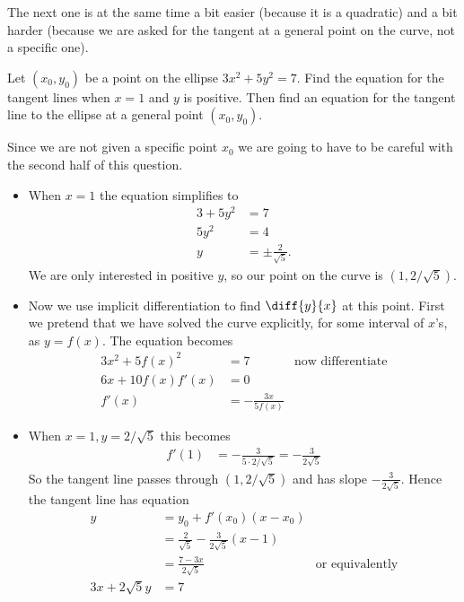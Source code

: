 The next one is at the same time a bit easier (because it is a quadratic) and a
bit harder (because we are asked for the tangent at a general point on the curve, not a
specific one).
\begin{eg}\label{eg:DIFFimpldiffA}
Let $(x_0,y_0)$ be a point on the ellipse $3x^2+5y^2=7$. Find the equation for
the tangent lines when $x=1$ and $y$ is positive. Then find an equation
for the tangent line to the ellipse at a general point $(x_0,y_0)$.

Since we are not given a specific point $x_0$ we are going to have to be
careful with the second half of this question.
\begin{itemize}
 \item When $x=1$ the equation simplifies to
\begin{align*}
  3 + 5y^2 &= 7 \\
  5y^2 &= 4 \\
  y &= \pm \frac{2}{\sqrt{5}}.
\end{align*}
We are only interested in positive $y$, so our point on the curve
is $(1,2/\sqrt{5})$.

\item Now we use implicit differentiation to find $\diff{y}{x}$ at
this point. First we pretend that we have solved the curve explicitly, for some interval
of $x$'s, as $y=f(x)$. The equation becomes
\begin{align*}
  3x^2 + 5f(x)^2 &= 7 & \text{now differentiate} \\
  6x + 10 f(x) f'(x) &= 0 \\
  f'(x) &= - \frac{3x}{5f(x)}
\end{align*}

\item When $x=1, y= 2/\sqrt{5}$ this becomes
\begin{align*}
  f'(1) &= - \frac{3}{5 \cdot 2/\sqrt{5}} = - \frac{3}{2\sqrt{5}}
\end{align*}
So the tangent line passes through $(1,2/\sqrt{5})$ and has slope $-
\frac{3}{2\sqrt{5}}$. Hence the tangent line has equation
\begin{align*}
  y &=y_0+f'(x_0)(x-x_0) \\
    &= \frac{2}{\sqrt{5}} - \frac{3}{2\sqrt{5}} (x-1) \\
  &= \frac{7 - 3x}{2\sqrt{5}} & \text{or equivalently} \\
  3x + 2\sqrt{5} y&= 7
\end{align*}
\end{itemize}


\end{eg}
